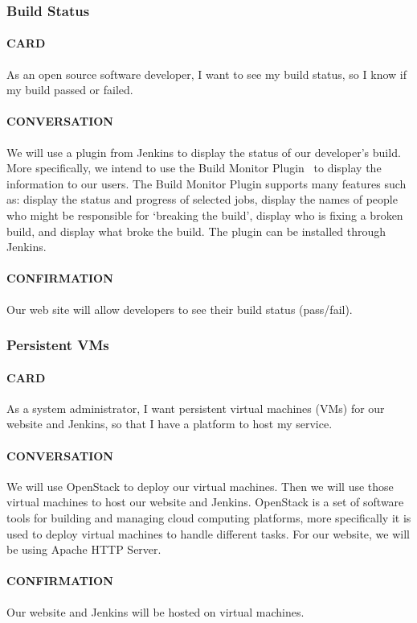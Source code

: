 \documentclass[10pt,letterpaper,onecolumn,draftclsnofoot]{IEEEtran}
\begin{document}
\subsubsection{Build Status}
\paragraph{CARD}
As an open source software developer, I want to see my build status, so I know if my build passed or failed.
\paragraph{CONVERSATION}
We will use a plugin from Jenkins to display the status of our developer's build. More specifically, we intend to use the Build Monitor Plugin~\cite{buildmonitor} to display the information to our users. The Build Monitor Plugin supports many features such as: display the status and progress of selected jobs, display the names of people who might be responsible for `breaking the build', display who is fixing a broken build, and display what broke the build. The plugin can be installed through Jenkins.
\paragraph{CONFIRMATION}
Our web site will allow developers to see their build status (pass/fail).

\subsubsection{Persistent VMs}
\paragraph{CARD}
As a system administrator, I want persistent virtual machines (VMs) for our website and Jenkins, so that I have a platform to host my service.
\paragraph{CONVERSATION}
We will use OpenStack to deploy our virtual machines. Then we will use those virtual machines to host our website and Jenkins. OpenStack is a set of software tools for building and managing cloud computing platforms, more specifically it is used to deploy virtual machines to handle different tasks. For our website, we will be using Apache HTTP Server.
\paragraph{CONFIRMATION}
Our website and Jenkins will be hosted on virtual machines.
\end{document}
